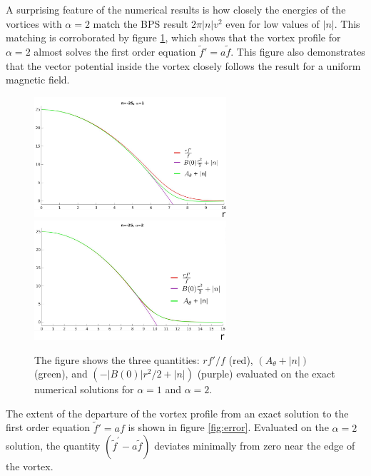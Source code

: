 A surprising feature of the numerical results is how closely the energies of the vortices with $\alpha=2$  match the BPS result $2\pi |n| v^2$ even for low values of $|n|$. This matching is corroborated by  figure \ref{fig:firstorder}, which shows that the vortex profile for $\alpha=2$  almost solves the first order equation $\tilde f' = a \tilde f$. This figure also demonstrates that the vector potential inside the vortex closely follows the result for a uniform magnetic field.
\begin{figure}[h]
\begin{center}
    \includegraphics[width=2.80in]{Chapter_2_Folder_1912.11321/figures/firstorderalpha1_corrected.pdf} \hspace{0.1in}
      \includegraphics[width=2.8in]{Chapter_2_Folder_1912.11321/figures/firstorderalpha2_corrected.pdf} 
    \caption{{\small The figure shows the three quantities: $rf'/f$ (red), $\left(A_\theta+|n|\right)$ (green), and $\left(-|B(0)|r^2/2+|n|\right)$ (purple) evaluated on the exact numerical solutions for $\alpha=1$ and $\alpha=2$.}} \label{fig:firstorder}
    \end{center}
\end{figure}
The extent of the departure of the vortex profile from an exact solution to the  first order equation $\tilde f'=a f$ is shown in figure \ref{fig:error}.  Evaluated on the $\alpha=2$ solution, the quantity $(\tilde f^\prime - a \tilde f)$ deviates minimally from zero near the edge of the vortex.
